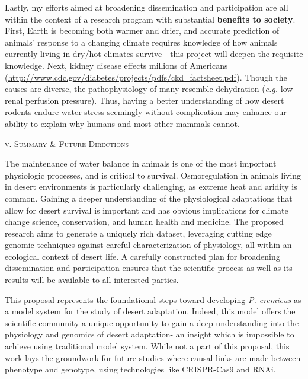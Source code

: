 \documentclass[11pt]{article}
\begin{document}
Lastly, my efforts aimed at broadening dissemination and participation are all within the context of a research program with substantial \textbf{benefits to society}. First, Earth is becoming both warmer and drier, and accurate prediction of animals' response to a changing climate requires knowledge of how animals currently living in dry/hot climates survive - this project will deepen the requisite knowledge. Next, kidney disease effects millions of Americans (\url{http://www.cdc.gov/diabetes/projects/pdfs/ckd_factsheet.pdf}). Though the causes are diverse, the pathophysiology of many resemble dehydration (\textit{e.g.} low renal perfusion pressure). Thus, having a better understanding of how desert rodents endure water stress seemingly without complication may enhance our ability to explain why humans and most other mammals cannot.             

\begin{center}
\textsc{{v. Summary \& Future Directions}} \\
\end{center}

The maintenance of water balance in animals is one of the most important physiologic processes, and is critical to survival. Osmoregulation in animals living in desert environments is particularly challenging, as extreme heat and aridity is common. Gaining a deeper understanding of the physiological adaptations that allow for desert survival is important and has obvious implications for climate change science, conservation, and human health and medicine. The proposed research aims to generate a uniquely rich dataset, leveraging cutting edge genomic techniques against careful characterization of physiology, all within an ecological context of desert life. A carefully constructed plan for broadening dissemination and participation ensures that the scientific process as well as its results will be available to all interested parties.   

This proposal represents the foundational steps toward developing \textit{P. eremicus} as a model system for the study of desert adaptation. Indeed, this model offers the scientific community a unique opportunity to gain a deep understanding into the physiology and genomics of desert adaptation- an insight which is impossible to achieve using traditional model system. While not a part of this proposal, this work lays the groundwork for future studies where causal links are made between phenotype and genotype, using technologies like CRISPR-Cas9 and RNAi. 
\end{document}
